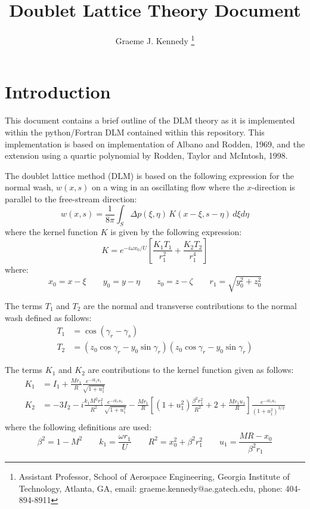 \documentclass[12pt]{article}
\title{Doublet Lattice Theory Document}
\author{Graeme J. Kennedy
  \thanks{Assistant Professor, School of Aerospace Engineering,
    Georgia Institute of Technology, Atlanta, GA, email:
    graeme.kennedy@ae.gatech.edu, phone: 404-894-8911}}
\date{}
\newcommand{\f}{\frac}
\begin{document}
\maketitle

\section{Introduction}

This document contains a brief outline of the DLM theory as it is
implemented within the python/Fortran DLM contained within this
repository. This implementation is based on implementation of Albano
and Rodden, 1969, and the extension using a quartic polynomial by
Rodden, Taylor and McIntosh, 1998.

The doublet lattice method (DLM) is based on the following expression
for the normal wash, $w(x, s)$ on a wing in an oscillating flow where
the $x$-direction is parallel to the free-stream direction:
%
\begin{equation}
  \label{eqn:normal-wash}
  w(x, s) = \f{1}{8\pi} 
  \int_{S} \Delta p(\xi, \eta) \, K(x - \xi, s - \eta) \, d\xi d\eta 
\end{equation}
where the kernel function $K$ is given by the following expression:
%
\begin{equation*}
  K = e^{-i\omega x_{0}/U} \left[ \f{K_1 T_1}{r_{1}^2} + \f{K_2 T_2}{r_{1}^4} \right]
\end{equation*}
where:
%
\begin{equation*}
  x_{0} = x - \xi \qquad
  y_{0} = y - \eta \qquad
  z_{0} = z - \zeta \qquad 
  r_{1} = \sqrt{y_{0}^2 + z_{0}^2}
\end{equation*}

The terms $T_{1}$ and $T_{2}$ are the normal and transverse
contributions to the normal wash defined as follows:
\begin{equation*}
  \begin{aligned}
    T_{1} & = \cos(\gamma_r - \gamma_s) \\
    T_{2} & = (z_{0} \cos \gamma_r - y_{0} \sin \gamma_r)(z_{0} \cos \gamma_r - y_{0} \sin \gamma_r)
  \end{aligned}
\end{equation*}

The terms $K_{1}$ and $K_{2}$ are contributions to the kernel function
given as follows:
%
\begin{equation*}
  \begin{aligned}
    K_{1} & = I_{1} + \f{Mr_{1}}{R} \f{e^{-ik_1 u_1}}{\sqrt{1 + u_{1}^2}} \\
    K_{2} & = -3I_{2} - i \f{k_1 M^2r_1^2}{R^2} \f{e^{-ik_1 u_1}}{\sqrt{1 + u_{1}^2}} 
    - \f{Mr_{1}}{R} \left[ (1 + u_{1}^2) \f{\beta^2r_{1}^2}{R^2} + 
      2 + \f{Mr_1u_{1}}{R} \right]\f{e^{-ik_1 u_1}}{(1 + u_{1}^2)^{3/2}} \\
  \end{aligned}
\end{equation*}
where the following definitions are used:
\begin{equation*}
  \beta^2 = 1 - M^2 \qquad 
  k_{1} = \f{\omega r_{1}}{U} \qquad 
  R^2 = x_{0}^2 + \beta^2r_{1}^2 \qquad 
  u_{1} = \f{MR - x_{0}}{\beta^2r_1}
\end{equation*}
\end{document}
